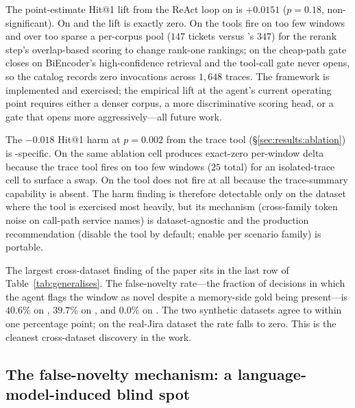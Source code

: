  The point-estimate Hit@1 lift from the ReAct loop on \dsob{} is $+0.0151$ ($p = 0.18$, non-significant). On \dsotel{} and \dswol{} the lift is exactly zero. On \dsotel{} the tools fire on too few windows and over too sparse a per-corpus pool ($147$ tickets versus \dsob{}'s $347$) for the rerank step's overlap-based scoring to change rank-one rankings; on \dswol{} the cheap-path gate closes on BiEncoder's high-confidence retrieval and the tool-call gate never opens, so the catalog records zero invocations across $1{,}648$ traces. The framework is implemented and exercised; the empirical lift at the agent's current operating point requires either a denser corpus, a more discriminative scoring head, or a gate that opens more aggressively---all future work.

 The $-0.018$ Hit@1 harm at $p = 0.002$ from the trace tool (\S\ref{sec:results:ablation}) is \dsob{}-specific. On \dsotel{} the same ablation cell produces exact-zero per-window delta because the trace tool fires on too few windows ($25$ total) for an isolated-trace cell to surface a swap. On \dswol{} the tool does not fire at all because the trace-summary capability is absent. The harm finding is therefore detectable only on the dataset where the tool is exercised most heavily, but its mechanism (cross-family token noise on call-path service names) is dataset-agnostic and the production recommendation (disable the tool by default; enable per scenario family) is portable.

 The largest cross-dataset finding of the paper sits in the last row of Table~\ref{tab:generalises}. The false-novelty rate---the fraction of decisions in which the agent flags the window as novel despite a memory-side gold being present---is $40.6\%$ on \dsob{}, $39.7\%$ on \dsotel{}, and $0.0\%$ on \dswol{}. The two synthetic datasets agree to within one percentage point; on the real-Jira dataset the rate falls to zero. This is the cleanest cross-dataset discovery in the work.

\subsection{The false-novelty mechanism: a language-model-induced blind spot}
\label{sec:cross-app:falsenovel}

